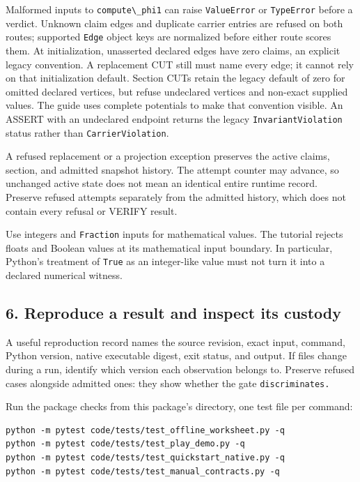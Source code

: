 \documentclass[
  11pt,
]{article}
\newcommand{\passthrough}[1]{#1}
\begin{document}
Malformed inputs to \passthrough{\lstinline!compute\_phi1!} can raise
\passthrough{\lstinline!ValueError!} or
\passthrough{\lstinline!TypeError!} before a verdict. Unknown claim
edges and duplicate carrier entries are refused on both routes;
supported \passthrough{\lstinline!Edge!} object keys are normalized
before either route scores them. At initialization, unasserted declared
edges have zero claims, an explicit legacy convention. A replacement CUT
still must name every edge; it cannot rely on that initialization
default. Section CUTs retain the legacy default of zero for omitted
declared vertices, but refuse undeclared vertices and non-exact supplied
values. The guide uses complete potentials to make that convention
visible. An ASSERT with an undeclared endpoint returns the legacy
\nolinkurl{InvariantViolation} status rather than
\nolinkurl{CarrierViolation}.

A refused replacement or a projection exception preserves the active
claims, section, and admitted snapshot history. The attempt counter may
advance, so unchanged active state does not mean an identical entire
runtime record. Preserve refused attempts separately from the admitted
history, which does not contain every refusal or VERIFY result.

Use integers and \passthrough{\lstinline!Fraction!} inputs for
mathematical values. The tutorial rejects floats and Boolean values at
its mathematical input boundary. In particular, Python's treatment of
\passthrough{\lstinline!True!} as an integer-like value must not turn it
into a declared numerical witness.

\subsection{6. Reproduce a result and inspect its
custody}\label{reproduce-a-result-and-inspect-its-custody}

A useful reproduction record names the source revision, exact input,
command, Python version, native executable digest, exit status, and
output. If files change during a run, identify which version each
observation belongs to. Preserve refused cases alongside admitted ones:
they show whether the gate \nolinkurl{discriminates.}

Run the package checks from this package's directory, one test file per
command:

\begin{lstlisting}
python -m pytest code/tests/test_offline_worksheet.py -q
python -m pytest code/tests/test_play_demo.py -q
python -m pytest code/tests/test_quickstart_native.py -q
python -m pytest code/tests/test_manual_contracts.py -q
\end{lstlisting}
\end{document}
